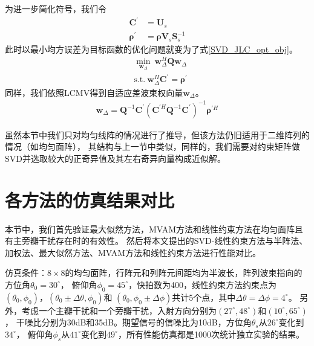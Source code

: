 \documentclass[master]{thesis-uestc}
\begin{document}
为进一步简化符号，我们令
\begin{subequations}
    \begin{align}
        \bm{C}^\prime &= \bm{U}_s \\
        \bm{\rho}^\prime &= \bm{\rho}\bm{V}_s\bm{S}_s^{-1}
    \end{align}
\end{subequations}
此时以最小均方误差为目标函数的优化问题就变为了式\eqref{SVD_JLC_opt_obj}。
\begin{equation}\label{SVD_JLC_opt_obj}
    \begin{aligned}
        &\min_{\bm{w}_\Delta} ~ \bm{w}^H_\Delta\bm{Q}\bm{w}_{\Delta} \\
        &\text{s.t.} ~ \bm{w}^H_\Delta\bm{C}^\prime = \bm{\rho}^\prime
    \end{aligned}
\end{equation}
同样，我们依照LCMV得到自适应差波束权向量$\bm{w}_\Delta$。
\begin{equation}
    \begin{aligned}
        \bm{w}_{\Delta} = \bm{Q}^{-1}\bm{C}^\prime
        \left(\bm{C}^{\prime H}\bm{Q}^{-1}\bm{C}^\prime\right)^{-1}\bm{\rho}^{\prime H}
    \end{aligned}
\end{equation}

虽然本节中我们只对均匀线阵的情况进行了推导，但该方法仍旧适用于二维阵列的情况（如均匀面阵），
其结构与上一节中类似，同样的，我们需要对约束矩阵做SVD并选取较大的正奇异值及其左右奇异向量构成近似解。

\section{各方法的仿真结果对比}
本节中，我们首先验证最大似然方法，MVAM方法和线性约束方法在均匀面阵且有主旁瓣干扰存在时的有效性。
然后将本文提出的SVD-线性约束方法与半阵法、加权法、最大似然方法、MVAM方法和线性约束方法进行性能对比。

仿真条件：$8\times8$的均匀面阵，行阵元和列阵元间距均为半波长，阵列波束指向的方位角$\theta_0=30^\circ$，
俯仰角$\phi_0=45^\circ$，快拍数为400，线性约束方法约束点为$(\theta_0,\phi_0)$，$(\theta_0\pm\Delta\theta,\phi_0)$和
$(\theta_0,\phi_0\pm\Delta\phi)$共计5个点，其中$\Delta\theta=\Delta\phi=4^\circ$。
另外，考虑一个主瓣干扰和一个旁瓣干扰，入射方向分别为$(27^\circ,48^\circ)$和$(10^\circ,65^\circ)$，
干噪比分别为30dB和35dB。期望信号的信噪比为10dB，方位角$\theta_s$从$26^\circ$变化到$34^\circ$，
俯仰角$\phi_s$从$41^\circ$变化到$49^\circ$，所有性能仿真都是1000次统计独立实验的结果。
\end{document}
